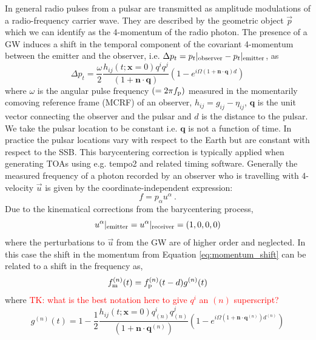 \documentclass[fleqn,usenatbib,useAMS]{mnras}
\begin{document}
In general radio pulses from a pulsar are transmitted as amplitude modulations of a radio-frequency carrier wave. They are described by the geometric object $\vec{p}$ which we can identify  as the 4-momentum of the radio photon. The presence of a GW induces a shift in the temporal component of the covariant 4-momentum between the emitter and the observer, i.e. $\Delta p_t = p_t|_{\rm observer} - p_t|_{\rm emitter} $, as \citep[e.g.][]{Maggiore}
\begin{equation}
 \Delta p_t = \frac{\omega}{2} \frac{ h_{ij} (t; \boldsymbol{x}= 0)q^i q^j }{(1 + \boldsymbol{n}\cdot \boldsymbol{q}) }  \left(1 -e^{i \Omega (1 + \boldsymbol{n}\cdot \boldsymbol{q})  d}\right)
	\label{eq:momentum_shift}
\end{equation}
where $\omega$ is the angular pulse frequency $(= 2 \pi f_{\rm p})$ measured in the momentarily comoving reference frame (MCRF) of an observer, $h_{ij} = g_{ij} - \eta_{ij}$, $\boldsymbol{q}$ is the unit vector connecting the observer and the pulsar and $d$ is the distance to the pulsar. We take the pulsar location to be constant i.e.  $\boldsymbol{q}$ is not a function of time. In practice the pulsar locations vary with respect to the Earth but are constant with respect to the SSB. This barycentering correction is typically applied when generating TOAs using e.g. {\sc tempo2} and related timing software. Generally the measured frequency of a photon recorded by an observer who is travelling with 4-velocity $\vec{u}$ is given by the coordinate-independent expression:
\begin{equation}
	f = p_{\alpha} u^{\alpha} \ . 
	\label{eq:freq_temporal}
\end{equation}
Due to the kinematical corrections from the barycentering process, 
\begin{equation}
	u^{\alpha}|_{\rm emitter} = u^{\alpha}|_{\rm receiver} = (1,0,0,0)
\end{equation}
where the perturbations to $\vec{u}$ from the GW are of higher order and neglected. In this case the shift in the momentum from Equation \ref{eq:momentum_shift} can be related to a shift in the frequency as,
\begin{equation}
	f_{\rm m}^{(n)}(t) = f_{\rm p}^{(n)}(t-d) g^{(n)}(t)
	\label{eq:measurement}
\end{equation}
where \textcolor{red}{TK: what is the best notation here to give $q^i$ an $(n)$ superscript?}
\begin{equation}
	g^{(n)}(t) = 1 -  \frac{1}{2} \frac{h_{ij} (t; \boldsymbol{x}= 0)q^{i}_{(n)} q^{j}_{(n)} }{(1 + \boldsymbol{n}\cdot \boldsymbol{q}^{(n)}) }  \left(1 -e^{i \Omega \left(1 + \boldsymbol{n}\cdot \boldsymbol{q}^{(n)} \right)  d^{(n)}}\right)
	\label{eq:g_func}
\end{equation}
\end{document}
